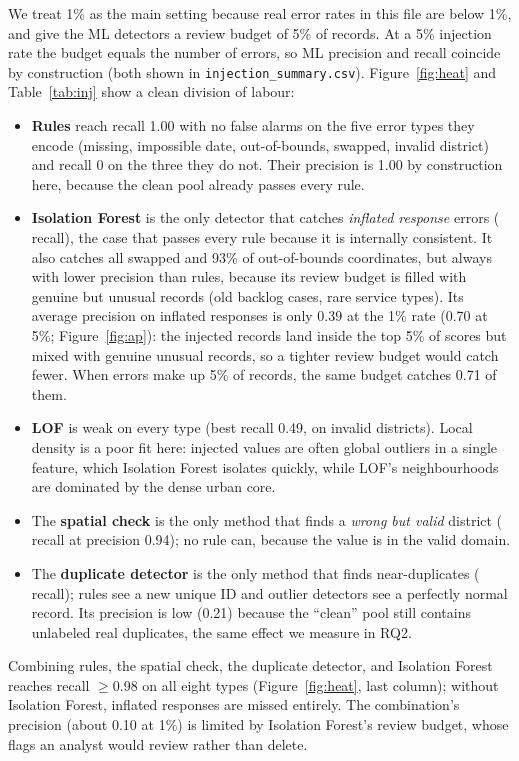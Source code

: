 \documentclass[11pt]{article}
\begin{document}


We treat 1\% as the main setting because real error rates in this file are below 1\%, and give the ML detectors a review budget of 5\% of records. At a 5\% injection rate the budget equals the number of errors, so ML precision and recall coincide by construction (both shown in \texttt{injection\_summary.csv}). Figure~\ref{fig:heat} and Table~\ref{tab:inj} show a clean division of labour:
\begin{itemize}
  \item \textbf{Rules} reach recall 1.00 with no false alarms on the five error types they encode (missing, impossible date, out-of-bounds, swapped, invalid district) and recall 0 on the three they do not. Their precision is 1.00 by construction here, because the clean pool already passes every rule.
  \item \textbf{Isolation Forest} is the only detector that catches \emph{inflated response} errors (\INFLIF{} recall), the case that passes every rule because it is internally consistent. It also catches all swapped and 93\% of out-of-bounds coordinates, but always with lower precision than rules, because its review budget is filled with genuine but unusual records (old backlog cases, rare service types). Its average precision on inflated responses is only 0.39 at the 1\% rate (0.70 at 5\%; Figure~\ref{fig:ap}): the injected records land inside the top 5\% of scores but mixed with genuine unusual records, so a tighter review budget would catch fewer. When errors make up 5\% of records, the same budget catches 0.71 of them.
  \item \textbf{LOF} is weak on every type (best recall 0.49, on invalid districts). Local density is a poor fit here: injected values are often global outliers in a single feature, which Isolation Forest isolates quickly, while LOF's neighbourhoods are dominated by the dense urban core.
  \item The \textbf{spatial check} is the only method that finds a \emph{wrong but valid} district (\WRONGKNN{} recall at precision 0.94); no rule can, because the value is in the valid domain.
  \item The \textbf{duplicate detector} is the only method that finds near-duplicates (\DUPREC{} recall); rules see a new unique ID and outlier detectors see a perfectly normal record. Its precision is low (0.21) because the ``clean'' pool still contains unlabeled real duplicates, the same effect we measure in RQ2.
\end{itemize}
Combining rules, the spatial check, the duplicate detector, and Isolation Forest reaches recall $\ge$0.98 on all eight types (Figure~\ref{fig:heat}, last column); without Isolation Forest, inflated responses are missed entirely. The combination's precision (about 0.10 at 1\%) is limited by Isolation Forest's review budget, whose flags an analyst would review rather than delete.
\end{document}
